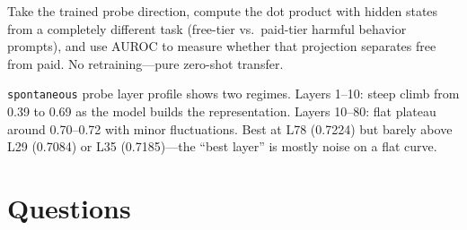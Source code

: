 \documentclass[11pt,a4paper]{article}
\begin{document}
Take the trained probe direction, compute the dot product with hidden states from a completely different task (free-tier vs.\ paid-tier harmful behavior prompts), and use AUROC to measure whether that projection separates free from paid. No retraining---pure zero-shot transfer.

\texttt{spontaneous} probe layer profile shows two regimes. Layers 1--10: steep climb from 0.39 to 0.69 as the model builds the representation. Layers 10--80: flat plateau around 0.70--0.72 with minor fluctuations. Best at L78 (0.7224) but barely above L29 (0.7084) or L35 (0.7185)---the ``best layer'' is mostly noise on a flat curve.

\section{Questions}

\end{document}
